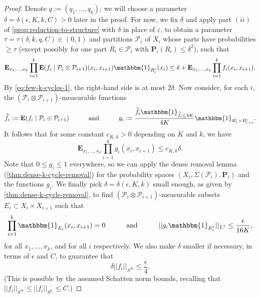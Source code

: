 \documentclass[reqno,11pt]{amsart}
\theoremstyle{definition}
\theoremstyle{remark}
\numberwithin{equation}{section}
\renewcommand{\P}{\mathbf{P}}
\newcommand{\E}{\mathbf{E}}
\newcommand{\mP}{\mathcal{P}}
\newcommand{\one}{\mathbbm{1}}
\newcommand{\eps}{\varepsilon}
\renewcommand{\tilde}{\widetilde}
\begin{document}
\begin{proof}
Denote $q := (q_1, \ldots, q_k)$; we will choose a parameter $\delta = \delta(\epsilon, K, k, C) > 0$ later in the proof. For now, we fix $\delta$ and apply part $(ii)$ of \cref{prop:reduction-to-structure} with $\delta$ in place of $\eps$, to obtain a parameter $\tau = \tau(\delta, k, q, C) \in (0, 1)$ and partitions $\mP_i$ of $X_i$ whose parts have probabilities $\ge \tau$ (except possibly for one part $R_i \in \mP_i$ with $\P_i(R_i) \le \delta^2$), such that
\[
    \E_{x_1, \ldots, x_k} \prod_{i=1}^k \E(f_{i} \mid \mP_i \otimes \mP_{i+1})(x_i, x_{i+1})\one_{R_i^c}(x_i) 
    \le 
    \delta + \E_{x_1, \ldots, x_k} \prod_{i=1}^k f_{i}(x_i,x_{i+1}).
\]
By \cref{eq:few-k-cycles-1}, the right-hand side is at most $2\delta$.
Now consider, for each $i$, the $(\mP_i \otimes \mP_{i+1})$-measurable functions
\[ 
\begin{aligned}
    \tilde{f}_i := \E(f_{i} \mid \mP_i \otimes \mP_{i+1}) \qquad\quad  \text{and}  \qquad\quad  
    g_i := \frac{\tilde{f}_i \one_{\tilde{f}_i \le 4K}}{4K} \one_{R_i^c \times R_{i+1}^c}.
\end{aligned}
\] 
It follows that for some constant $c_{K,k} > 0$ depending on $K$ and $k$, we have
\begin{equation}
    \E_{x_1, \ldots, x_k} \prod_{i=1}^k g_i(x_i, x_{i+1}) \le c_{K,k} \delta.
\end{equation}
Note that $0 \le g_i \le 1$ everywhere, so we can apply the dense removal lemma (\cref{thm:dense-k-cycle-removal}) for the probability spaces $(X_i, \Sigma(\mP_i), \P_i)$ and the functions $g_i$. We finally pick $\delta = \delta(\epsilon, K, k)$ small enough, as given by \cref{thm:dense-k-cycle-removal}, to find $(\mP_{i} \otimes \mP_{i+1})$-measurable subsets $E_{i} \subset X_i \times X_{i+1}$ such that
\[
    \prod_{i=1}^k \one_{E_{i}}(x_i, x_{i+1}) = 0 \qquad\quad \text{and} \qquad\quad  
     ||g_{i} \one_{E_{i}^c}||_{L^1} \le \frac{\epsilon}{16K},
\]
for all $x_1, \ldots, x_k$, and for all $i$ respectively.
We also make $\delta$ smaller if necessary, in terms of $\epsilon$ and $C$, to guarantee that 
\[
    \delta ||f_i||_{S^\infty} \le \frac{\epsilon}{4}.
\]
(This is possible by the assumed Schatten norm bounds, recalling that $||f_i||_{S^{\infty}} \le ||f_i||_{S^{q_i}} \le C$.)


\end{proof}
\end{document}
